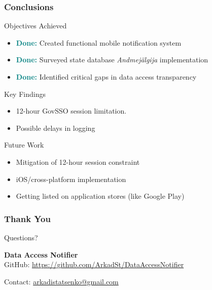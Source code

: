 \documentclass[aspectratio=169,11pt]{beamer}
\begin{document}
\begin{frame}
\frametitle{Conclusions}
\begin{block}{Objectives Achieved}
\begin{itemize}
    \item \textcolor{teal}{\textbf{Done:}} Created functional mobile notification system
    \item \textcolor{teal}{\textbf{Done:}} Surveyed state database \textit{Andmejälgija} implementation
    \item \textcolor{teal}{\textbf{Done:}} Identified critical gaps in data access transparency
\end{itemize}
\end{block}

\begin{block}{Key Findings}
\begin{itemize}
    \item 12-hour GovSSO session limitation.
    \item Possible delays in logging
\end{itemize}
\end{block}

\begin{block}{Future Work}
\begin{itemize}
    \item Mitigation of 12-hour session constraint
    \item iOS/cross-platform implementation
    \item Getting listed on application stores (like Google Play)
\end{itemize}
\end{block}
\end{frame}

\begin{frame}
\frametitle{Thank You}
\begin{center}
\Large Questions?

\vspace{1cm}

\normalsize
\textbf{Data Access Notifier}\\
GitHub: \url{https://github.com/ArkadSt/DataAccessNotifier}

\vspace{0.5cm}

Contact: \href{mailto:arkadistatsenko@gmail.com}{arkadistatsenko@gmail.com}
\end{center}
\end{frame}
\end{document}
